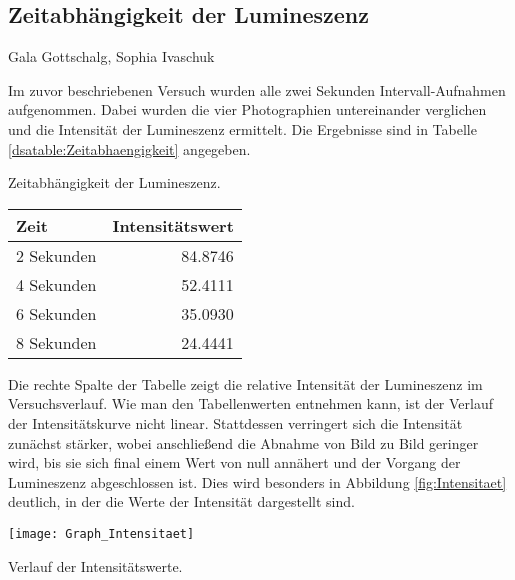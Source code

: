 \subsection{Zeitabhängigkeit der Lumineszenz} 

Gala Gottschalg, Sophia Ivaschuk

Im zuvor beschriebenen Versuch wurden alle zwei Sekunden Intervall-Aufnahmen aufgenommen. Dabei wurden die vier Photographien untereinander verglichen und die Intensität der Lumineszenz ermittelt. Die Ergebnisse sind in Tabelle \ref{dsatable:Zeitabhaengigkeit} angegeben.

\begin{dsatable}
 \caption{Zeitabhängigkeit der Lumineszenz.}
 \centering
 \begin{tabular}{lr} %
  \toprule
  Zeit &  Intensitätswert\\
  \midrule
  2 Sekunden      & 84.8746\\
  4 Sekunden      & 52.4111\\
  6 Sekunden      & 35.0930\\
  8 Sekunden      & 24.4441\\
  \bottomrule
 \end{tabular}
 \label{dsatable:Zeitabhaengigkeit}
\end{dsatable}


Die rechte Spalte der Tabelle zeigt die relative Intensität der Lumineszenz im Versuchsverlauf. Wie man den Tabellenwerten entnehmen kann, ist der Verlauf der Intensitätskurve nicht linear. Stattdessen verringert sich die Intensität zunächst stärker, wobei anschließend die Abnahme von Bild zu Bild geringer wird, bis sie sich final einem Wert von null annähert und der Vorgang der Lumineszenz abgeschlossen ist.
Dies wird besonders in Abbildung \ref{fig:Intensitaet} deutlich, in der die Werte der Intensität dargestellt sind.

\begin{dsafigure}
 \centering
 \texttt{[image: Graph\_Intensitaet]}
 \caption{Verlauf der Intensitätswerte.}
 \label{fig:Intensitaet}
\end{dsafigure}


